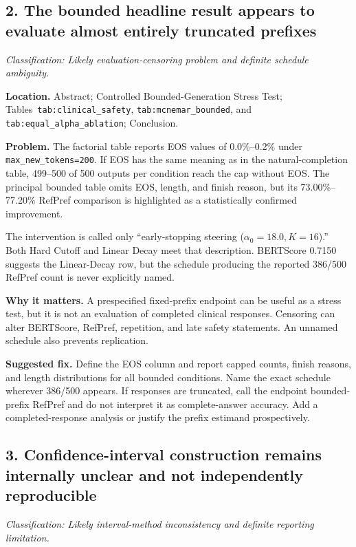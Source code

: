 \documentclass[11pt]{article}
\newcommand{\findinglabel}[1]{\textbf{#1}}
\newcommand{\classification}[1]{\textit{Classification: #1.}}
\begin{document}
\subsection*{2. The bounded headline result appears to evaluate almost entirely truncated prefixes}

\classification{Likely evaluation-censoring problem and definite schedule ambiguity}

\findinglabel{Location.} Abstract; Controlled Bounded-Generation Stress Test; Tables~\texttt{tab:clinical\_safety}, \texttt{tab:mcnemar\_bounded}, and \texttt{tab:equal\_alpha\_ablation}; Conclusion.

\findinglabel{Problem.} The factorial table reports EOS values of 0.0\%--0.2\% under \texttt{max\_new\_tokens=200}.  If EOS has the same meaning as in the natural-completion table, 499--500 of 500 outputs per condition reach the cap without EOS.  The principal bounded table omits EOS, length, and finish reason, but its 73.00\%--77.20\% RefPref comparison is highlighted as a statistically confirmed improvement.

The intervention is called only ``early-stopping steering ($\alpha_0=18.0,K=16$).''  Both Hard Cutoff and Linear Decay meet that description.  BERTScore 0.7150 suggests the Linear-Decay row, but the schedule producing the reported 386/500 RefPref count is never explicitly named.

\findinglabel{Why it matters.} A prespecified fixed-prefix endpoint can be useful as a stress test, but it is not an evaluation of completed clinical responses.  Censoring can alter BERTScore, RefPref, repetition, and late safety statements.  An unnamed schedule also prevents replication.

\findinglabel{Suggested fix.} Define the EOS column and report capped counts, finish reasons, and length distributions for all bounded conditions.  Name the exact schedule wherever 386/500 appears.  If responses are truncated, call the endpoint bounded-prefix RefPref and do not interpret it as complete-answer accuracy.  Add a completed-response analysis or justify the prefix estimand prospectively.

\subsection*{3. Confidence-interval construction remains internally unclear and not independently reproducible}

\classification{Likely interval-method inconsistency and definite reporting limitation}
\end{document}
